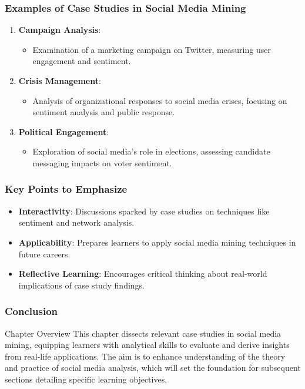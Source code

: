 \documentclass{beamer}
\begin{document}
\begin{frame}[fragile]
    \frametitle{Examples of Case Studies in Social Media Mining}
    \begin{enumerate}
        \item \textbf{Campaign Analysis}:
            \begin{itemize}
                \item Examination of a marketing campaign on Twitter, measuring user engagement and sentiment.
            \end{itemize}
        \item \textbf{Crisis Management}:
            \begin{itemize}
                \item Analysis of organizational responses to social media crises, focusing on sentiment analysis and public response.
            \end{itemize}
        \item \textbf{Political Engagement}:
            \begin{itemize}
                \item Exploration of social media's role in elections, assessing candidate messaging impacts on voter sentiment.
            \end{itemize}
    \end{enumerate}
\end{frame}

\begin{frame}[fragile]
    \frametitle{Key Points to Emphasize}
    \begin{itemize}
        \item \textbf{Interactivity}: Discussions sparked by case studies on techniques like sentiment and network analysis.
        \item \textbf{Applicability}: Prepares learners to apply social media mining techniques in future careers.
        \item \textbf{Reflective Learning}: Encourages critical thinking about real-world implications of case study findings.
    \end{itemize}
\end{frame}

\begin{frame}[fragile]
    \frametitle{Conclusion}
    \begin{block}{Chapter Overview}
        This chapter dissects relevant case studies in social media mining, equipping learners with analytical skills to evaluate and derive insights from real-life applications. 
        The aim is to enhance understanding of the theory and practice of social media analysis, which will set the foundation for subsequent sections detailing specific learning objectives.
    \end{block}
\end{frame}
\end{document}
